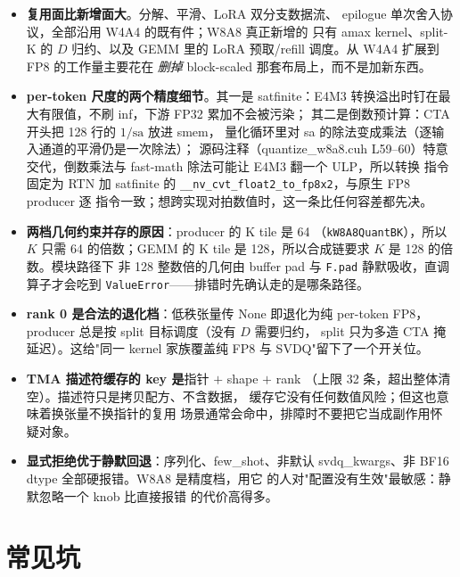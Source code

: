 \begin{itemize}[itemsep=1pt,topsep=2pt]
  \item \textbf{复用面比新增面大}。分解、平滑、LoRA 双分支数据流、
        epilogue 单次舍入协议，全部沿用 W4A4 的既有件；W8A8 真正新增的
        只有 amax kernel、split-K 的 $D$ 归约、以及 GEMM 里的 LoRA
        预取/refill 调度。从 W4A4 扩展到 FP8 的工作量主要花在
        \emph{删掉} block-scaled 那套布局上，而不是加新东西。
  \item \textbf{per-token 尺度的两个精度细节}。其一是 satfinite：E4M3
        转换溢出时钉在最大有限值，不刷 inf，下游 FP32 累加不会被污染；
        其二是倒数预计算：CTA 开头把 128 行的 $1/\mathrm{sa}$ 放进 smem，
        量化循环里对 sa 的除法变成乘法（逐输入通道的平滑仍是一次除法）；
        源码注释（quantize\_w8a8.cuh L59--60）特意
        交代，倒数乘法与 fast-math 除法可能让 E4M3 翻一个 ULP，所以转换
        指令固定为 RTN 加 satfinite 的
        \texttt{\_\_nv\_cvt\_float2\_to\_fp8x2}，与原生 FP8 producer 逐
        指令一致；想跨实现对拍数值时，这一条比任何容差都先决。
  \item \textbf{两档几何约束并存的原因}：producer 的 K tile 是 64
        （\texttt{kW8A8QuantBK}），所以 $K$ 只需 64 的倍数；GEMM 的
        K tile 是 128，所以合成链要求 $K$ 是 128 的倍数。模块路径下
        非 128 整数倍的几何由 buffer pad 与 \texttt{F.pad} 静默吸收，直调
        算子才会吃到 \texttt{ValueError}——排错时先确认走的是哪条路径。
  \item \textbf{rank 0 是合法的退化档}：低秩张量传 None 即退化为纯
        per-token FP8，producer 总是按 split 目标调度（没有 $D$ 需要归约，
        split 只为多造 CTA 掩延迟）。这给"同一 kernel 家族覆盖纯 FP8 与
        SVDQ"留下了一个开关位。
  \item \textbf{TMA 描述符缓存的 key 是}指针 $+$ shape $+$ rank
        （上限 32 条，超出整体清空）。描述符只是拷贝配方、不含数据，
        缓存它没有任何数值风险；但这也意味着换张量不换指针的复用
        场景通常会命中，排障时不要把它当成副作用怀疑对象。
  \item \textbf{显式拒绝优于静默回退}：序列化、few\_shot、非默认
        svdq\_kwargs、非 BF16 dtype 全部硬报错。W8A8 是精度档，用它
        的人对"配置没有生效"最敏感：静默忽略一个 knob 比直接报错
        的代价高得多。
\end{itemize}

\section{常见坑}

